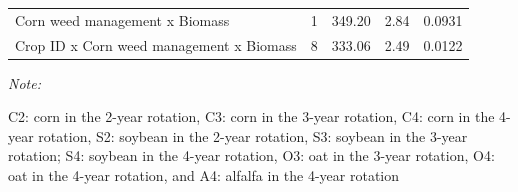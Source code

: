 \documentclass[
]{article}
\begin{document}
\begin{table}
{\begin{threeparttable}
\begin{tabular}[t]{lrrrl}
\hspace{1em}Corn weed management x Biomass & 1 & 349.20 & 2.84 & 0.0931\\
\hspace{1em}Crop ID x Corn weed management x Biomass & 8 & 333.06 & 2.49 & 0.0122\\
\bottomrule
\end{tabular}
\begin{tablenotes}[para]
\item \textit{Note: } 
\item C2: corn in the 2-year rotation, C3: corn in the 3-year rotation, C4: corn in the 4-year rotation, S2: soybean in the 2-year rotation, S3: soybean in the 3-year rotation; S4: soybean in the 4-year rotation, O3: oat in the 3-year rotation, O4: oat in the 4-year rotation, and A4: alfalfa in the 4-year rotation
\end{tablenotes}
\end{threeparttable}}
\end{table}
\end{document}
